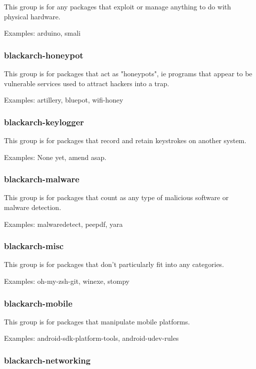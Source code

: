 \documentclass[a4paper, oneside, 11pt]{book}
\begin{document}
This group is for any packages that exploit or manage anything to do with physical hardware.

Examples: arduino, smali

\subsubsection{blackarch-honeypot}

This group is for packages that act as "honeypots", ie programs that appear to be vulnerable services used to attract hackers into a trap.

Examples: artillery, bluepot, wifi-honey

\subsubsection{blackarch-keylogger}

This group is for packages that record and retain keystrokes on another system.

Examples: None yet, amend asap.

\subsubsection{blackarch-malware}

This group is for packages that count as any type of malicious software or malware detection.

Examples: malwaredetect, peepdf, yara

\subsubsection{blackarch-misc}

This group is for packages that don't particularly fit into any categories.

Examples: oh-my-zsh-git, winexe, stompy

\subsubsection{blackarch-mobile}

This group is for packages that manipulate mobile platforms.

Examples: android-sdk-platform-tools, android-udev-rules

\subsubsection{blackarch-networking}
\end{document}
